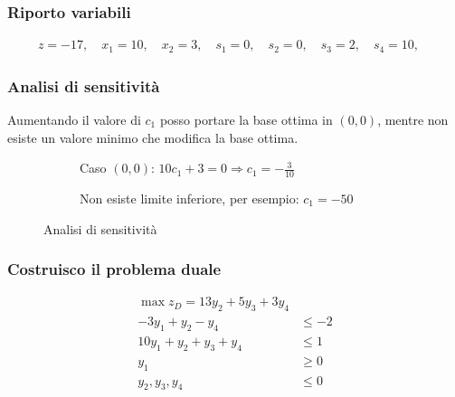 \documentclass[\main/main.tex]{subfiles}
\begin{document}
\subsubsection*{Riporto variabili}

\begin{align*}
  z   = -17, \quad
  x_1 = 10 , \quad
  x_2 = 3  , \quad
  s_1 = 0  , \quad
  s_2 = 0  , \quad
  s_3 = 2  , \quad
  s_4 = 10 , \quad
\end{align*}
\subsubsection*{Analisi di sensitività}
Aumentando il valore di $c_1$ posso portare la base ottima in $(0,0)$, mentre non esiste un valore minimo che modifica la base ottima.

\begin{figure}
  \begin{subfigure}{0.49\textwidth}
    \caption{Caso $(0,0)$: $10c_1 + 3 = 0 \Rightarrow c_1 = -\frac{3}{10}$}
  \end{subfigure}
  \begin{subfigure}{0.49\textwidth}
    \caption{Non esiste limite inferiore, per esempio: $c_1 = -50$}
  \end{subfigure}
  \caption{Analisi di sensitività}
\end{figure}

\subsubsection*{Costruisco il problema duale}
\begin{align*}
  \max z_D = 13y_2 + 5y_3 + 3y_4   \\
  -3y_1 +y_2 -y_4        & \leq -2 \\
  10y_1 + y_2 + y_3 +y_4 & \leq 1  \\
  y_1                    & \geq 0  \\
  y_2, y_3, y_4          & \leq 0
\end{align*}
\end{document}
